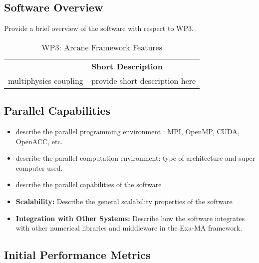 \subsection{Software Overview}
\label{sec:WP3:Arcane Framework:summary}

Provide a brief overview of the software with respect to WP3.

\begin{table}[h!]
    \centering
    { 
        \setlength{\parindent}{0pt}
        \def\arraystretch{1.25}
        {
            \fontsize{9}{11}\selectfont
            \begin{tabular}{!{\color{numpexgray}\vrule}p{.25\linewidth}!{\color{numpexgray}\vrule}p{.6885\linewidth}!{\color{numpexgray}\vrule}}
    
     &  {\rule{0pt}{2.5ex}\color{white}\bf Short Description }\\ 
    
    multiphysics coupling & provide short description here \\
\end{tabular}
        }
    }
    \caption{WP3: Arcane Framework Features}
\end{table}


\subsection{Parallel Capabilities}
\label{sec:WP3:Arcane Framework:performances}


\begin{itemize}
    \item describe the parallel programming  environment : MPI, OpenMP, CUDA, OpenACC, etc.
    \item describe the parallel computation environment: type of architecture and super computer used.
    \item describe the parallel capabilities of the software
    \item \textbf{Scalability:} Describe the general scalability properties of the software
    \item \textbf{Integration with Other Systems:} Describe how the software integrates with other numerical libraries and middleware in the Exa-MA framework.
\end{itemize}

\subsection{Initial Performance Metrics}
\label{sec:WP3:Arcane Framework:metrics}

